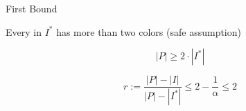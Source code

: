 \begin{frame}{First Bound}

Every \pack{} in $I^*$ has more than two colors
(safe assumption)

\pause
\begin{observation}
$$ |P| \geq 2 \cdot |I^*| $$
\end{observation}

\pause
\begin{corollary}
$$r := \frac{|P| - |I|}{|P| - |I^*|} \leq 2 - \frac{1}{\alpha} \leq 2$$
\end{corollary}


\end{frame}


